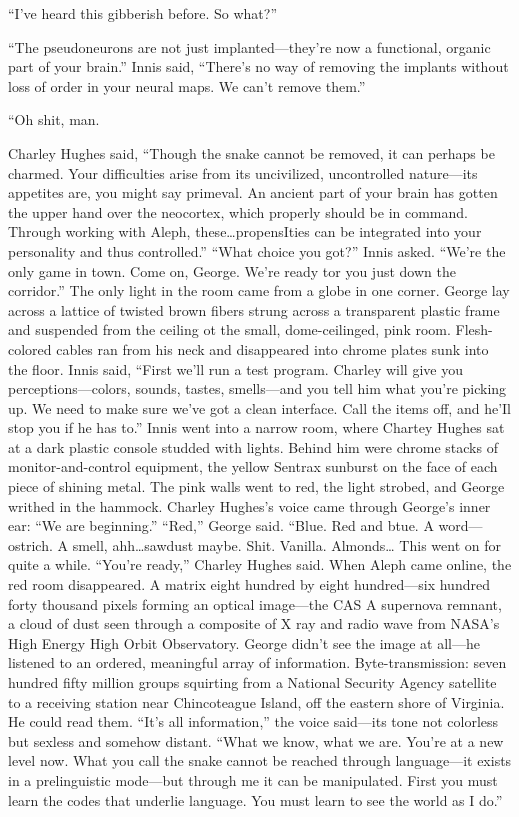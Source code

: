 ``I've heard this gibberish before. So what?''

``The pseudoneurons are not just implanted—they're now a functional, organic part of your brain.''
Innis said, ``There's no way of removing the implants without loss of order in your neural maps. We can't remove them.''

``Oh shit, man.

Charley Hughes said, ``Though the snake cannot be removed, it can perhaps be charmed. Your difficulties arise from its uncivilized, uncontrolled nature—its appetites are, you might say primeval. An ancient part of your brain has gotten the upper hand over the neocortex, which properly should be in command. Through working with Aleph, these\ldots propensIties can be integrated into your personality and thus controlled.''
``What choice you got?'' Innis asked. ``We're the only game in town. Come on, George. We're ready tor you just down the corridor.''
The only light in the room came from a globe in one corner. George lay across a lattice of twisted brown fibers strung across a transparent plastic frame and suspended from the ceiling ot the small, dome-ceilinged, pink room. Flesh-colored cables ran from his neck and disappeared into chrome plates sunk into the floor.
Innis said, ``First we'll run a test program. Charley will give you perceptions—colors, sounds, tastes, smells—and you tell him what you're picking up. We need to make sure we've got a clean interface. Call the items off, and he'Il stop you if he has to.''
Innis went into a narrow room, where Chartey Hughes sat at a dark plastic console studded with lights. Behind him were chrome stacks of monitor-and-control equipment, the yellow Sentrax sunburst on the face of each piece of shining metal.
The pink walls went to red, the light strobed, and George writhed in the hammock. Charley Hughes's voice came through George's inner ear: ``We are beginning.''
``Red,'' George said. ``Blue. Red and btue. A word—ostrich. A smell, ahh\ldots sawdust maybe. Shit. Vanilla. Almonds\ldots
This went on for quite a while. ``You're ready,'' Charley Hughes said.
When Aleph came online, the red room disappeared. A matrix eight hundred by eight hundred—six hundred forty thousand pixels forming an optical image—the CAS A supernova remnant, a cloud of dust seen through a composite of X ray and radio wave from NASA's High Energy High Orbit Observatory. George didn't see the image at all—he listened to an ordered, meaningful array of information.
Byte-transmission: seven hundred fifty million groups squirting from a National Security Agency satellite to a receiving station near Chincoteague Island, off the eastern shore of Virginia. He could read them.
``It's all information,'' the voice said—its tone not colorless but sexless and somehow distant. ``What we know, what we are. You're at a new level now. What you call the snake cannot be reached through language—it exists in a prelinguistic mode—but through me it can be manipulated. First you must learn the codes that underlie language. You must learn to see the world as I do.''

